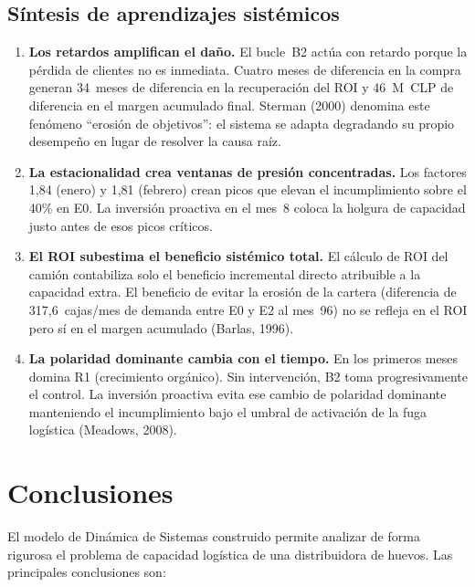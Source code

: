 \documentclass[10pt,a4paper]{article}
\begin{document}
\subsection{Síntesis de aprendizajes sistémicos}

\begin{enumerate}
  \item \textbf{Los retardos amplifican el daño.} El bucle~B2 actúa con retardo porque la pérdida de clientes no es inmediata. Cuatro meses de diferencia en la compra generan 34~meses de diferencia en la recuperación del ROI y 46~M~CLP de diferencia en el margen acumulado final. Sterman (2000) denomina este fenómeno ``erosión de objetivos'': el sistema se adapta degradando su propio desempeño en lugar de resolver la causa raíz.

  \item \textbf{La estacionalidad crea ventanas de presión concentradas.} Los factores 1,84 (enero) y 1,81 (febrero) crean picos que elevan el incumplimiento sobre el 40\% en E0. La inversión proactiva en el mes~8 coloca la holgura de capacidad justo antes de esos picos críticos.

  \item \textbf{El ROI subestima el beneficio sistémico total.} El cálculo de ROI del camión contabiliza solo el beneficio incremental directo atribuible a la capacidad extra. El beneficio de evitar la erosión de la cartera (diferencia de 317,6~cajas/mes de demanda entre E0 y E2 al mes~96) no se refleja en el ROI pero sí en el margen acumulado (Barlas, 1996).

  \item \textbf{La polaridad dominante cambia con el tiempo.} En los primeros meses domina R1 (crecimiento orgánico). Sin intervención, B2 toma progresivamente el control. La inversión proactiva evita ese cambio de polaridad dominante manteniendo el incumplimiento bajo el umbral de activación de la fuga logística (Meadows, 2008).
\end{enumerate}

\newpage

\section{Conclusiones}

El modelo de Dinámica de Sistemas construido permite analizar de forma rigurosa el problema de capacidad logística de una distribuidora de huevos. Las principales conclusiones son:
\end{document}
